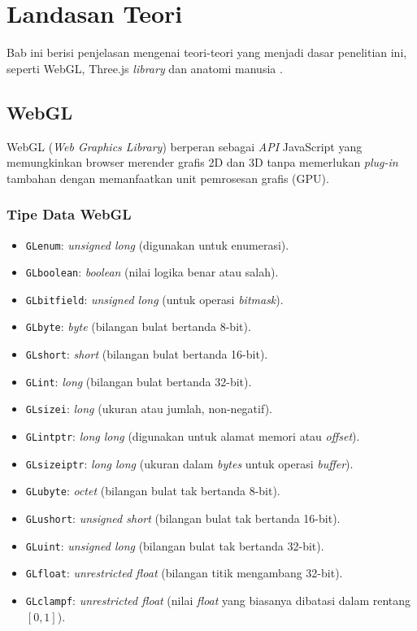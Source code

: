 \chapter{Landasan Teori}
\label{chap:teori}


Bab ini berisi penjelasan mengenai teori-teori yang menjadi dasar penelitian ini, seperti WebGL, Three.js \textit{library} dan anatomi manusia .

\section {WebGL}
\label{sec:WebGL}

WebGL (\textit{Web Graphics Library}) berperan sebagai \textit{API} JavaScript yang memungkinkan browser merender grafis 2D dan 3D tanpa memerlukan \textit{plug-in }tambahan dengan memanfaatkan unit pemrosesan grafis (GPU). 
\subsection{Tipe Data WebGL}
\begin{itemize}
    \item \texttt{GLenum}: \textit{unsigned long} (digunakan untuk enumerasi).
    \item \texttt{GLboolean}: \textit{boolean} (nilai logika benar atau salah).
    \item \texttt{GLbitfield}: \textit{unsigned long} (untuk operasi \textit{bitmask}).
    \item \texttt{GLbyte}: \textit{byte} (bilangan bulat bertanda 8-bit).
    \item \texttt{GLshort}: \textit{short} (bilangan bulat bertanda 16-bit).
    \item \texttt{GLint}: \textit{long} (bilangan bulat bertanda 32-bit).
    \item \texttt{GLsizei}: \textit{long} (ukuran atau jumlah, non-negatif).
    \item \texttt{GLintptr}: \textit{long long} (digunakan untuk alamat memori atau \textit{offset}).
    \item \texttt{GLsizeiptr}: \textit{long long} (ukuran dalam \textit{bytes} untuk operasi \textit{buffer}).
    \item \texttt{GLubyte}: \textit{octet} (bilangan bulat tak bertanda 8-bit).
    \item \texttt{GLushort}: \textit{unsigned short} (bilangan bulat tak bertanda 16-bit).
    \item \texttt{GLuint}: \textit{unsigned long} (bilangan bulat tak bertanda 32-bit).
    \item \texttt{GLfloat}: \textit{unrestricted float} (bilangan titik mengambang 32-bit).
    \item \texttt{GLclampf}: \textit{unrestricted float} (nilai \textit{float} yang biasanya dibatasi dalam rentang $[0, 1]$).
\end{itemize}

